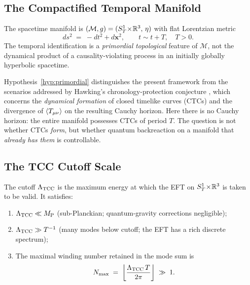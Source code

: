 \documentclass[12pt,openany]{book}
\begin{document}
\subsection{The Compactified Temporal Manifold}
\label{sec:manifold}

\begin{hypothesisA}
\label{hyp:primordial}
The spacetime manifold is
$(\mathcal{M},g) = (S^{1}_{T}\!\times\!\mathbb{R}^{3},\,\eta)$
with flat Lorentzian metric
\begin{equation}\label{eq:metric}
  ds^{2} \;=\; -dt^{2} + d\mathbf{x}^{2},
  \qquad t \sim t + T,\quad T>0.
\end{equation}
The temporal identification is a \emph{primordial topological} feature
of $\mathcal{M}$, not the dynamical product of a causality-violating
process in an initially globally hyperbolic spacetime.
\end{hypothesisA}

\begin{remarkA}
Hypothesis~\ref{hyp:primordial} distinguishes the present framework from
the scenarios addressed by Hawking's chronology-protection conjecture
\cite{Hawking1992}, which concerns the \emph{dynamical formation} of
closed timelike curves (CTCs) and the divergence of
$\langle T_{\mu\nu} \rangle$ on the resulting Cauchy horizon.
Here there is no Cauchy horizon: the entire manifold possesses CTCs
of period $T$.
The question is not whether CTCs \emph{form}, but whether quantum
backreaction on a manifold that \emph{already has them} is controllable.
\end{remarkA}

\subsection{The TCC Cutoff Scale}
\label{sec:cutoff}

\begin{definitionA}
\label{def:Ltcc}
The cutoff $\Lambda_{\mathrm{TCC}}$ is the maximum energy at which the EFT on
$S^{1}_{T}\!\times\!\mathbb{R}^{3}$ is taken to be valid.  It satisfies:
\begin{enumerate}
  \item[(C1)] $\Lambda_{\mathrm{TCC}} \ll M_{\mathrm{P}}$\quad
    (sub-Planckian; quantum-gravity corrections negligible);
  \item[(C2)] $\Lambda_{\mathrm{TCC}} \gg T^{-1}$\quad
    (many modes below cutoff; the EFT has a rich discrete spectrum);
  \item[(C3)] The maximal winding number retained in the mode sum is
    \begin{equation}\label{eq:Nmax}
      N_{\max} \;=\;
        \left\lfloor \frac{\Lambda_{\mathrm{TCC}} \, T}{2\pi} \right\rfloor \;\gg\; 1.
    \end{equation}
\end{enumerate}
\end{definitionA}
\end{document}
